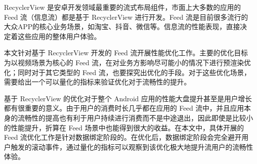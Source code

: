 RecyclerView 是安卓开发领域最重要的流式布局组件，市面上大多数的应用的 Feed 流（信息流）都是基于 RecyclerView 进行开发。Feed 流是目前很多流行的大众APP的核心业务场景，如淘宝、抖音、微信等。信息流的性能表现，直接决定着这些应用的整体用户体验。

本文针对基于 RecyclerView 开发的 Feed 流开展性能优化工作。主要的优化目标为以视频场景为核心的 Feed 流，在对业务方影响尽可能小的情况下进行预渲染优化；同时对于其它类型的 Feed 流，也要探究出优化的手段。对于这些优化场景，需要给出一个可以量化的指标来验证优化对于流畅性的提升。

基于 RecyclerView 的优化对于整个 Android 应用的性能大盘提升甚至是用户增长都有很重要的意义。由于用户的消费时长几乎都在应用的 Feed 流中，并且应用本身的流畅性的提高也有利于用户持续进行消费而不是中途退出，因此即使是比较小的性能提升，折算在 Feed 场景中也能得到很大的收益。在本文中，具体开展的 Feed 流优化工作是针对数据绑定阶段的。在优化后，数据绑定阶段会完全避开用户触发的滚动事件，通过量化的指标可以观察到该优化极大地提升流用户的流畅性体验。





